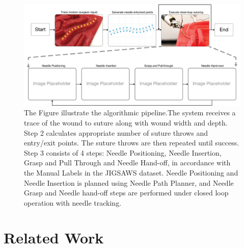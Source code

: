 \documentclass[0-suturing.tex]{subfiles}
\begin{document}
\begin{figure}[!t]
\centering
\includegraphics[width=0.9\linewidth]{figures/fsm}
\caption{ The Figure illustrate the algorithmic pipeline.The system receives a trace of the wound to suture along with wound width and depth. Step 2 calculates appropriate number of suture throws and entry/exit points. The suture throws are then repeated until success. Step 3  consists of 4 steps: Needle Positioning, Needle Insertion, Grasp and Pull Through and Needle Hand-off, in accordance with the Manual Labels in the JIGSAWS dataset. Needle Positioning and Needle Insertion is planned using Needle Path Planner, and Needle Grasp and Needle hand-off steps are performed under closed loop operation with needle tracking.}
\label{fig:fsm}
\vspace{-10pt}
\end{figure}

\section{Related Work}
\label{sec:relWork}

\end{document}
